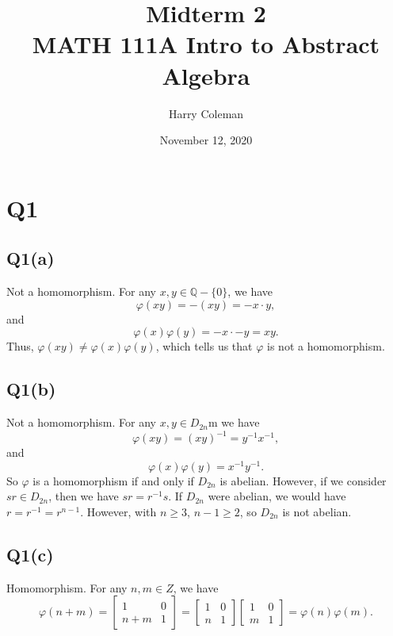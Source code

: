 \documentclass[12pt]{article}
\let\phi\varphi %
\newcommand{\Q}{\mathbb{Q}} %
\newcommand{\<}{\left\langle} %
\renewcommand{\>}{\right\rangle} %
\begin{document}
 
\title{Midterm 2\\
    \large MATH 111A Intro to Abstract Algebra
}
\author{Harry Coleman}
\date{November 12, 2020}
\maketitle

\section*{Q1}

\subsection*{Q1(a)}

Not a homomorphism. For any $x,y\in\Q-\{0\}$, we have
\[\phi(xy) = -(xy) = -x \cdot y,\]
and
\[\phi(x)\phi(y) = -x \cdot -y = xy.\]
Thus, $\phi(xy)\ne\phi(x)\phi(y)$, which tells us that $\phi$ is not a homomorphism.

\subsection*{Q1(b)}

Not a homomorphism. For any $x,y\in D_{2n}$m we have
\[\phi(xy) = (xy)^{-1} = y^{-1}x^{-1},\]
and
\[\phi(x)\phi(y) = x^{-1}y^{-1}.\]
So $\phi$ is a homomorphism if and only if $D_{2n}$ is abelian. However, if we consider $sr \in D_{2n}$, then we have $sr = r^{-1}s$. If $D_{2n}$ were abelian, we would have $r=r^{-1}=r^{n-1}$. However, with $n\geq 3$, $n-1\geq 2$, so $D_{2n}$ is not abelian.

\subsection*{Q1(c)}

Homomorphism. For any $n,m\in Z$, we have
\[\phi(n+m) = \begin{bmatrix}1 & 0 \\ n+m & 1\end{bmatrix} = \begin{bmatrix}1 & 0 \\ n & 1\end{bmatrix}\begin{bmatrix}1 & 0 \\ m & 1\end{bmatrix} = \phi(n)\phi(m).\]
\end{document}
